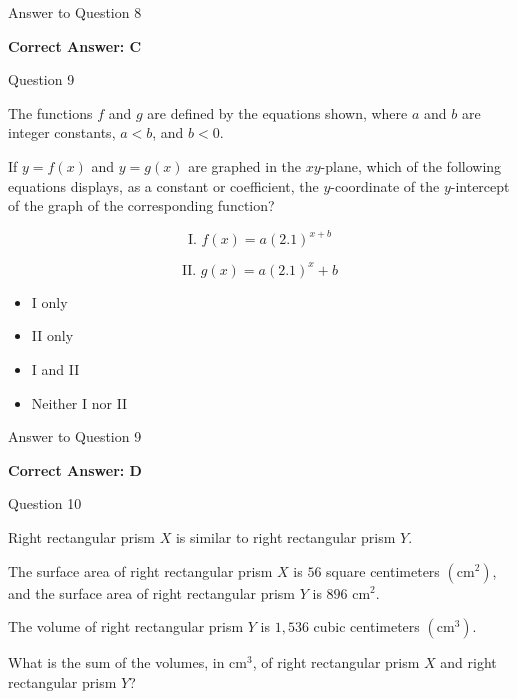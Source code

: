 \documentclass{beamer}
\begin{document}
\begin{frame}{Answer to Question 8}

\textbf{Correct Answer: C}

\end{frame}


\begin{frame}{Question 9}

The functions $f$ and $g$ are defined by the equations shown, where $a$ and $b$ are integer constants, $a<b$, and $b<0$.

If $y=f(x)$ and $y=g(x)$ are graphed in the $xy$-plane, which of the following equations displays, as a constant or coefficient, the $y$-coordinate of the $y$-intercept of the graph of the corresponding function?

\[
\text{I. } f(x)=a(2.1)^{x+b}
\]

\[
\text{II. } g(x)=a(2.1)^x+b
\]

\begin{itemize}
    \item[A.] I only
    \item[B.] II only
    \item[C.] I and II
    \item[D.] Neither I nor II
\end{itemize}

\end{frame}

\begin{frame}{Answer to Question 9}

\textbf{Correct Answer: D}

\end{frame}


\begin{frame}{Question 10}

Right rectangular prism $X$ is similar to right rectangular prism $Y$.

The surface area of right rectangular prism $X$ is $56$ square centimeters $(\text{cm}^2)$, and the surface area of right rectangular prism $Y$ is $896\text{ cm}^2$.

The volume of right rectangular prism $Y$ is $1,536$ cubic centimeters $(\text{cm}^3)$.

What is the sum of the volumes, in $\text{cm}^3$, of right rectangular prism $X$ and right rectangular prism $Y$?

\end{frame}
\end{document}
